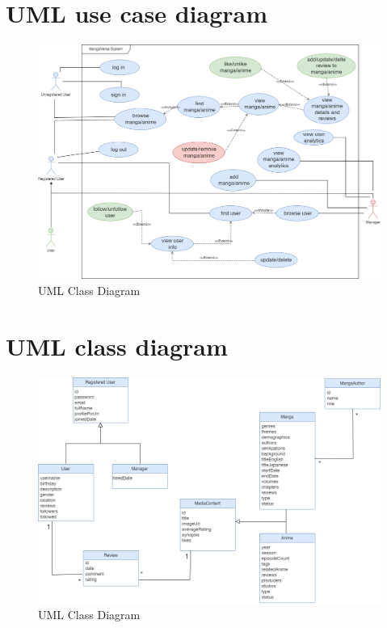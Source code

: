 \section{UML use case diagram}
\begin{figure}[h]
    \centering
    \includegraphics[width=\linewidth]{Media/use_case.png}
    \caption{UML Class Diagram}
    \label{uml class diagram}
\end{figure}

\newpage

\section{UML class diagram}
\begin{figure}[h]
    \centering
    \includegraphics[width=\linewidth]{Media/Class Diagram.png}
    \caption{UML Class Diagram}
    \label{uml class diagram}
\end{figure}


